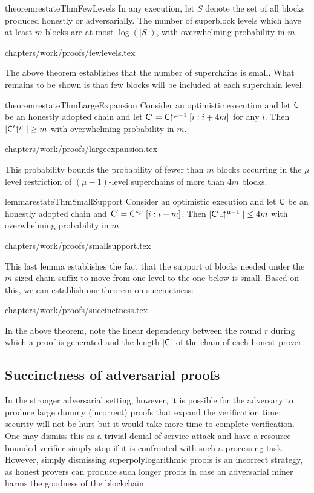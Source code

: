 \begin{restatable}{theorem}{restateThmFewLevels}
    \label{thm.few-levels}
    In any execution, let $S$ denote the set of all blocks produced honestly or
    adversarially. The number of superblock levels which have at least $m$
    blocks are at most $\log(|S|)$, with overwhelming probability in $m$.
\end{restatable}
{chapters/work/proofs/fewlevels.tex}

The above theorem establishes that the number of superchains is small. What
remains to be shown is that few blocks will be included at each superchain
level.

\begin{restatable}{theorem}{restateThmLargeExpansion}
    \label{thm.large-expansion}
    Consider an optimistic execution and let $\mathsf{C}$ be an honestly adopted
    chain and let $\mathsf{C}' = \mathsf{C}\negthickspace\uparrow^{\mu - 1}[i:i + 4m]$ for any $i$.
    Then $|\mathsf{C}'\negthickspace\uparrow^\mu| \geq m$ with overwhelming probability in $m$.
\end{restatable}
{chapters/work/proofs/largeexpansion.tex}

This probability bounds the probability of fewer than $m$ blocks occurring in
the $\mu$ level restriction of $(\mu - 1)$-level superchains of more than $4m$
blocks.

\begin{restatable}{lemma}{restateThmSmallSupport}
    \label{lem.small-support}
    Consider an optimistic execution and let $\mathsf{C}$ be an honestly adopted
    chain and $\mathsf{C}' = \mathsf{C}\negthickspace\uparrow^\mu[i:i + m]$. Then
    $|\mathsf{C}'\negthickspace\downarrow\,\negthickspace\uparrow^{\mu - 1}| \leq 4m$ with overwhelming
    probability in $m$.
\end{restatable}
{chapters/work/proofs/smallsupport.tex}

This last lemma establishes the fact that the support of blocks needed under
the $m$-sized chain suffix to move from one level to the one below is small.
Based on this, we can establish our theorem on succinctness:

\restateThmSuccinctness
{chapters/work/proofs/succinctness.tex}

In the above theorem, note the linear dependency between the round $r$ during
which a proof is generated and the length $|\mathsf{C}|$ of the chain of each honest
prover.

\subsection{Succinctness of adversarial proofs}
In the stronger adversarial setting, however, it is possible for the adversary
to produce large dummy (incorrect) proofs that expand the verification time;
security will not be hurt but it would take more time to complete verification.
One may dismiss this as a trivial denial of service attack and have a resource
bounded verifier simply stop if it is confronted with such a processing task.
However, simply dismissing superpolylogarithmic proofs is an incorrect strategy,
as honest provers can produce such longer proofs in case an adversarial miner
harms the goodness of the blockchain.

